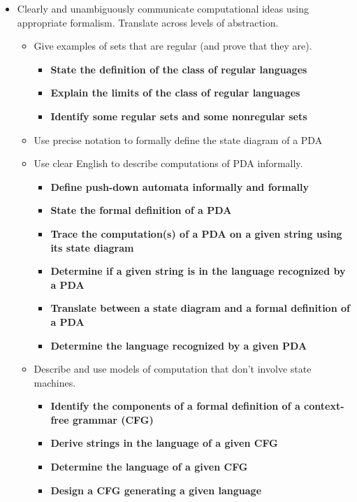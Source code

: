 \begin{itemize}
    \item Clearly and unambiguously communicate computational ideas using appropriate formalism. Translate across levels of abstraction.
    \begin{itemize}
       \item Give examples of sets that are regular (and prove that they are).
       \begin{itemize}
          \item {\bf State the definition of the class of regular languages}
          \item {\bf Explain the limits of the class of regular languages}
          \item {\bf Identify some regular sets and some nonregular sets}
       \end{itemize}
       \item Use precise notation to formally define the state diagram of a PDA
       \item Use clear English to describe computations of PDA informally.
       \begin{itemize}
           \item {\bf Define push-down automata informally and formally}
           \item {\bf State the formal definition of a PDA}
           \item {\bf Trace the computation(s) of a PDA on a given string using its state diagram}
           \item {\bf Determine if a given string is in the language recognized by a PDA}
           \item {\bf Translate between a state diagram and a formal deﬁnition of a PDA}
           \item {\bf Determine the language recognized by a given PDA}
        \end{itemize}
        \item Describe and use models of computation that don't involve state machines.
        \begin{itemize}
            \item {\bf Identify the components of a formal definition of a context-free grammar (CFG)}
            \item {\bf Derive strings in the language of a given CFG}
            \item {\bf Determine the language of a given CFG}
            \item {\bf Design a CFG generating a given language}
        \end{itemize}
    \end{itemize}

\end{itemize}

